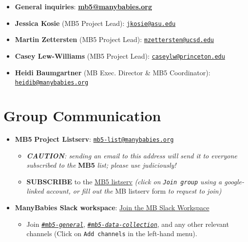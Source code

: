 \documentclass[
  letterpaper,
  DIV=11,
  numbers=noendperiod,
  oneside]{scrreprt}
\providecommand{\tightlist}{%
  \setlength{\itemsep}{0pt}\setlength{\parskip}{0pt}}
\begin{document}
\begin{itemize}
\item
  \textbf{General inquiries}:
  \href{mailto:mb5@manybabies.org}{\textbf{mb5@manybabies.org}}
\item
  \textbf{Jessica Kosie} (MB5 Project Lead):
  \href{mailto:jkosie@asu.edu}{\nolinkurl{jkosie@asu.edu}}
\item
  \textbf{Martin Zettersten} (MB5 Project Lead):
  \href{mailto:mzettersten@ucsd.edu}{\nolinkurl{mzettersten@ucsd.edu}}
\item
  \textbf{Casey Lew-Williams} (MB5 Project Lead):
  \href{mailto:caseylw@princeton.edu}{\nolinkurl{caseylw@princeton.edu}}
\item
  \textbf{Heidi Baumgartner} (MB Exec. Director \& MB5 Coordinator):
  \href{mailto:heidib@manybabies.org}{\nolinkurl{heidib@manybabies.org}}
\end{itemize}

\section{Group Communication}\label{group-communication}

\begin{itemize}
\item
  \textbf{MB5} \textbf{Project Listserv}:
  \href{mailto:mb5-list@manybabies.org}{\nolinkurl{mb5-list@manybabies.org}}

  \begin{itemize}
  \item
    \emph{\textbf{CAUTION}: sending an email to this address will send
    it to everyone subscribed to the} \textbf{MB5} \emph{list; please
    use judiciously!}
  \item
    \textbf{SUBSCRIBE} to the
    \href{https://groups.google.com/a/manybabies.org/g/mb5-list}{MB5
    listserv} \emph{(click on \texttt{Join\ group} using a google-linked
    account, or fill out the} MB listserv form \emph{to request to
    join)}
  \end{itemize}
\item
  \textbf{ManyBabies Slack workspace}:
  \href{https://join.slack.com/t/manybabies/shared_invite/zt-3hv85sl5d-JWzJYourJw8kCttK46l~kw}{Join
  the MB Slack Workspace}

  \begin{itemize}
  \tightlist
  \item
    Join
    \href{https://manybabies.slack.com/archives/C03U2J2GZ2A}{\emph{\texttt{\#mb5-general}}},
    \href{https://manybabies.slack.com/archives/C0AUKJ27YQG}{\emph{\texttt{\#mb5-data-collection}}},
    and any other relevant channels (Click on \texttt{Add\ channels} in
    the left-hand menu).
  \end{itemize}
\end{itemize}
\end{document}
